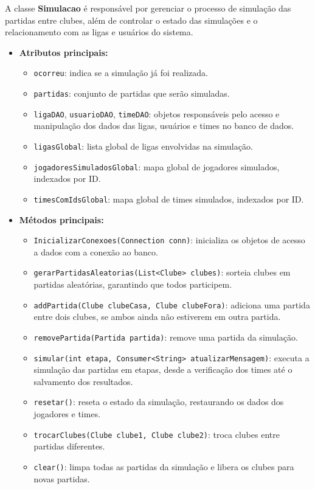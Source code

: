 \documentclass[12pt]{article}
\begin{document}
A classe \textbf{Simulacao} é responsável por gerenciar o processo de simulação das partidas entre clubes, além de controlar o estado das simulações e o relacionamento com as ligas e usuários do sistema.

\begin{itemize}
  \item \textbf{Atributos principais:}
        \begin{itemize}
          \item \texttt{ocorreu}: indica se a simulação já foi realizada.
          \item \texttt{partidas}: conjunto de partidas que serão simuladas.
          \item \texttt{ligaDAO}, \texttt{usuarioDAO}, \texttt{timeDAO}: objetos responsáveis pelo acesso e manipulação dos dados das ligas, usuários e times no banco de dados.
          \item \texttt{ligasGlobal}: lista global de ligas envolvidas na simulação.
          \item \texttt{jogadoresSimuladosGlobal}: mapa global de jogadores simulados, indexados por ID.
          \item \texttt{timesComIdsGlobal}: mapa global de times simulados, indexados por ID.
        \end{itemize}
  \item \textbf{Métodos principais:}
        \begin{itemize}
          \item \texttt{InicializarConexoes(Connection conn)}: inicializa os objetos de acesso a dados com a conexão ao banco.
          \item \texttt{gerarPartidasAleatorias(List<Clube> clubes)}: sorteia clubes em partidas aleatórias, garantindo que todos participem.
          \item \texttt{addPartida(Clube clubeCasa, Clube clubeFora)}: adiciona uma partida entre dois clubes, se ambos ainda não estiverem em outra partida.
          \item \texttt{removePartida(Partida partida)}: remove uma partida da simulação.
          \item \texttt{simular(int etapa, Consumer<String> atualizarMensagem)}: executa a simulação das partidas em etapas, desde a verificação dos times até o salvamento dos resultados.
          \item \texttt{resetar()}: reseta o estado da simulação, restaurando os dados dos jogadores e times.
          \item \texttt{trocarClubes(Clube clube1, Clube clube2)}: troca clubes entre partidas diferentes.
          \item \texttt{clear()}: limpa todas as partidas da simulação e libera os clubes para novas partidas.
        \end{itemize}
\end{itemize}
\end{document}
